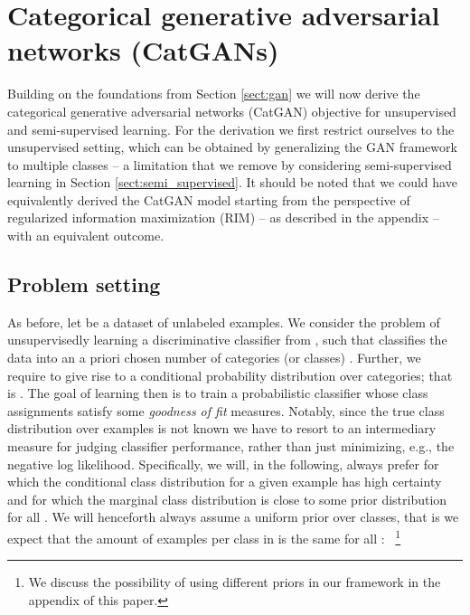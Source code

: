 \documentclass{article} \usepackage{iclr2016_conference,times}
\begin{document}
\section{Categorical generative adversarial networks (CatGANs)}
Building on the foundations from Section \ref{sect:gan} we will now
derive the categorical generative adversarial networks (CatGAN)
objective for unsupervised and semi-supervised learning. For the
derivation we first restrict ourselves to the unsupervised setting,
which can be obtained by generalizing the GAN framework to multiple
classes -- a limitation that we remove by considering semi-supervised
learning in Section \ref{sect:semi_supervised}. It should be noted
that we could have equivalently derived the CatGAN model starting from
the perspective of regularized information maximization (RIM) -- as
described in the appendix -- with an equivalent outcome.

\subsection{Problem setting}
\label{sect:problem}
As before, let  be a
dataset of unlabeled examples. We consider the problem of
unsupervisedly learning a discriminative classifier  from
, such that  classifies the data into an a priori chosen
number of categories (or classes) . Further, we require  to
give rise to a conditional probability distribution over categories;
that is . The goal of learning
then is to train a probabilistic classifier  whose class
assignments satisfy some \emph{goodness of fit} measures. Notably,
since the true class distribution over examples is not known we have
to resort to an intermediary measure for judging classifier
performance, rather than just minimizing, e.g., the negative log
likelihood. Specifically, we will, in the following, always prefer 
for which the conditional class distribution  for a
given example  has high certainty and for which
the marginal class distribution  is close to some prior
distribution  for all . We will henceforth always assume a
uniform prior over classes, that is we expect that the amount of
examples per class in  is the same for all :
~\footnote{We
  discuss the possibility of using different priors in our framework
  in the appendix of this paper.}
\end{document}
